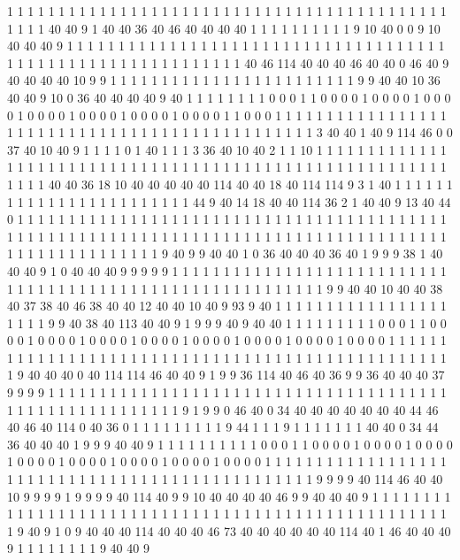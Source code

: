 1 1 1 1 1 1 1 1 1 1 1 1 1 1 1 1 1 1 1 1
1 1 1 1 1 1 1 1 1 1 1 1 1 1 1 1 1 1 1 1
1 1 1 1 1 1 1 40 40 9 1 40 40 36 40 46 40 40 40 40
1 1 1 1 1 1 1 1 1 1 9 10 40 0 0 9 10 40 40 40
9 1 1 1 1 1 1 1 1 1 1 1 1 1 1 1 1 1 1 1
1 1 1 1 1 1 1 1 1 1 1 1 1 1 1 1 1 1 1 1
1 1 1 1 1 1 1 1 1 1 1 1 1 1 1 1 1 1 1 1
1 40 46 114 40 40 40 46 40 40 0 46 40 9 40 40 40 40 10 9
9 1 1 1 1 1 1 1 1 1 1 1 1 1 1 1 1 1 1 1
1 1 1 1 1 9 9 40 40 10 36 40 40 9 10 0 36 40 40 40
40 9 40 1 1 1 1 1 1 1 1 0 0 0 1 1 0 0 0 0
1 0 0 0 0 1 0 0 0 0 1 0 0 0 0 1 0 0 0 0
1 0 0 0 0 1 0 0 0 0 1 1 0 0 0 1 1 1 1 1
1 1 1 1 1 1 1 1 1 1 1 1 1 1 1 1 1 1 1 1
1 1 1 1 1 1 1 1 1 1 1 1 1 1 1 1 1 1 1 1
1 1 3 40 40 1 40 9 114 46 0 0 37 40 10 40 9 1 1 1
1 0 1 40 1 1 1 3 36 40 10 40 2 1 1 10 1 1 1 1
1 1 1 1 1 1 1 1 1 1 1 1 1 1 1 1 1 1 1 1
1 1 1 1 1 1 1 1 1 1 1 1 1 1 1 1 1 1 1 1
1 1 1 1 1 1 1 1 1 1 1 1 1 1 1 1 40 40 36 18
10 40 40 40 40 40 114 40 40 18 40 114 114 9 3 1 40 1 1 1
1 1 1 1 1 1 1 1 1 1 1 1 1 1 1 1 1 1 1 1
1 44 9 40 14 18 40 40 114 36 2 1 40 40 9 13 40 44 0 1
1 1 1 1 1 1 1 1 1 1 1 1 1 1 1 1 1 1 1 1
1 1 1 1 1 1 1 1 1 1 1 1 1 1 1 1 1 1 1 1
1 1 1 1 1 1 1 1 1 1 1 1 1 1 1 1 1 1 1 1
1 1 1 1 1 1 1 1 1 1 1 1 1 1 1 1 1 1 1 1
1 1 1 1 1 1 1 1 1 1 1 1 1 1 1 1 1 1 1 9
40 9 9 40 40 1 0 36 40 40 40 36 40 1 9 9 9 38 1 40
40 40 9 1 0 40 40 40 9 9 9 9 9 1 1 1 1 1 1 1
1 1 1 1 1 1 1 1 1 1 1 1 1 1 1 1 1 1 1 1
1 1 1 1 1 1 1 1 1 1 1 1 1 1 1 1 1 1 1 1
1 1 1 1 1 1 1 1 1 1 1 9 9 40 40 10 40 40 38 40
37 38 40 46 38 40 40 12 40 40 10 40 9 93 9 40 1 1 1 1
1 1 1 1 1 1 1 1 1 1 1 1 1 1 1 1 1 9 9 40
38 40 113 40 40 9 1 9 9 9 40 9 40 40 1 1 1 1 1 1
1 1 1 0 0 0 1 1 0 0 0 0 1 0 0 0 0 1 0 0
0 0 1 0 0 0 0 1 0 0 0 0 1 0 0 0 0 1 0 0
0 0 1 0 0 0 0 1 1 1 1 1 1 1 1 1 1 1 1 1
1 1 1 1 1 1 1 1 1 1 1 1 1 1 1 1 1 1 1 1
1 1 1 1 1 1 1 1 1 1 1 1 1 1 1 1 1 9 40 40
40 0 40 114 114 46 40 40 9 1 9 9 36 114 40 46 40 36 9 9
36 40 40 40 37 9 9 9 9 1 1 1 1 1 1 1 1 1 1 1
1 1 1 1 1 1 1 1 1 1 1 1 1 1 1 1 1 1 1 1
1 1 1 1 1 1 1 1 1 1 1 1 1 1 1 1 1 1 1 1
1 1 1 1 1 9 1 9 9 0 46 40 0 34 40 40 40 40 40 40
40 44 46 40 46 40 114 0 40 36 0 1 1 1 1 1 1 1 1 1
9 44 1 1 1 9 1 1 1 1 1 1 1 40 40 0 34 44 36 40
40 40 1 9 9 9 40 40 9 1 1 1 1 1 1 1 1 1 1 0
0 0 1 1 0 0 0 0 1 0 0 0 0 1 0 0 0 0 1 0
0 0 0 1 0 0 0 0 1 0 0 0 0 1 0 0 0 0 1 0
0 0 0 1 1 1 1 1 1 1 1 1 1 1 1 1 1 1 1 1
1 1 1 1 1 1 1 1 1 1 1 1 1 1 1 1 1 1 1 1
1 1 1 1 1 1 1 1 1 1 1 9 9 9 9 40 114 46 40 40
10 9 9 9 9 1 9 9 9 9 40 114 40 9 9 10 40 40 40 40
46 9 9 40 40 40 9 1 1 1 1 1 1 1 1 1 1 1 1 1
1 1 1 1 1 1 1 1 1 1 1 1 1 1 1 1 1 1 1 1
1 1 1 1 1 1 1 1 1 1 1 1 1 1 1 1 1 1 1 9
40 9 1 0 9 40 40 40 114 40 40 40 46 73 40 40 40 40 40 40
114 40 1 46 40 40 40 9 1 1 1 1 1 1 1 1 9 40 40 9
